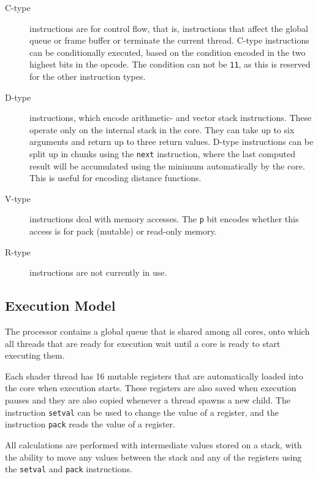 			\begin{description}
				\item[C-type] instructions are for control flow, that is, 
					instructions that affect the global queue or frame buffer or
					terminate the current thread. C-type instructions can be 
					conditionally executed, based on the condition encoded in
					the two highest bits in the opcode. The condition can not
					be \texttt{11}, as this is reserved for the other 
					instruction types.

				\item[D-type] instructions, which encode arithmetic- and vector
					stack instructions. These operate only on the internal stack
					in the core. They can take up to six arguments and return up
					to three return values. D-type instructions can be split up 
					in chunks using the \texttt{next} instruction, where the 
					last computed result will be accumulated using the minimum
					automatically by the core. This is useful for encoding 
					distance functions.
					
				\item[V-type] instructions deal with memory accesses. The
					\texttt{p} bit encodes whether this access is for pack
					(mutable) or read-only memory.

				\item[R-type] instructions are not currently in use.
			\end{description}
		
		\subsection{Execution Model}

			The processor contains a global queue that is shared among all
			cores, onto which all threads that are ready for execution wait
			until a core is ready to start executing them.
			
			Each shader thread has 16 mutable registers that are automatically
			loaded into the core when execution starts. These registers are
			also saved when execution pauses and they are also copied whenever
			a thread spawns a new child. The instruction \texttt{setval} can be
			used to change the value of a register, and the instruction
			\texttt{pack} reads the value of a register.
	
			All calculations are performed with intermediate values stored on a
			stack, with the ability to move any values between the stack and
			any of the registers using the \texttt{setval} and \texttt{pack}
			instructions.
	
